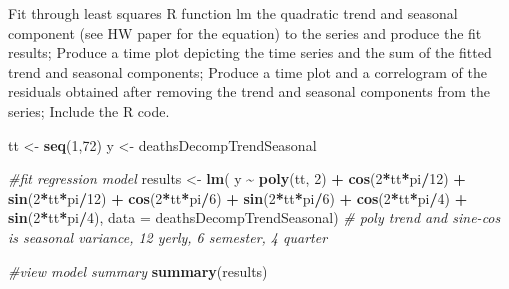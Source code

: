 \documentclass[
]{article}
\newenvironment{Shaded}{\begin{snugshade}}{\end{snugshade}}
\newcommand{\AttributeTok}[1]{\textcolor[rgb]{0.13,0.29,0.53}{#1}}
\newcommand{\CommentTok}[1]{\textcolor[rgb]{0.56,0.35,0.01}{\textit{#1}}}
\newcommand{\DecValTok}[1]{\textcolor[rgb]{0.00,0.00,0.81}{#1}}
\newcommand{\FunctionTok}[1]{\textcolor[rgb]{0.13,0.29,0.53}{\textbf{#1}}}
\newcommand{\NormalTok}[1]{#1}
\newcommand{\OtherTok}[1]{\textcolor[rgb]{0.56,0.35,0.01}{#1}}
\newcommand{\SpecialCharTok}[1]{\textcolor[rgb]{0.81,0.36,0.00}{\textbf{#1}}}
\begin{document}
Fit through least squares R function lm the quadratic trend and seasonal
component (see HW paper for the equation) to the series and produce the
fit results; Produce a time plot depicting the time series and the sum
of the fitted trend and seasonal components; Produce a time plot and a
correlogram of the residuals obtained after removing the trend and
seasonal components from the series; Include the R code.

\begin{Shaded}
\begin{Highlighting}[]
\NormalTok{tt }\OtherTok{\textless{}{-}} \FunctionTok{seq}\NormalTok{(}\DecValTok{1}\NormalTok{,}\DecValTok{72}\NormalTok{)}
\NormalTok{y }\OtherTok{\textless{}{-}}\NormalTok{ deathsDecompTrendSeasonal}

\CommentTok{\#fit regression model}
\NormalTok{results }\OtherTok{\textless{}{-}} \FunctionTok{lm}\NormalTok{( y }\SpecialCharTok{\textasciitilde{}} \FunctionTok{poly}\NormalTok{(tt, }\DecValTok{2}\NormalTok{) }\SpecialCharTok{+}
                 \FunctionTok{cos}\NormalTok{(}\DecValTok{2}\SpecialCharTok{*}\NormalTok{tt}\SpecialCharTok{*}\NormalTok{pi}\SpecialCharTok{/}\DecValTok{12}\NormalTok{) }\SpecialCharTok{+} \FunctionTok{sin}\NormalTok{(}\DecValTok{2}\SpecialCharTok{*}\NormalTok{tt}\SpecialCharTok{*}\NormalTok{pi}\SpecialCharTok{/}\DecValTok{12}\NormalTok{) }\SpecialCharTok{+}
                 \FunctionTok{cos}\NormalTok{(}\DecValTok{2}\SpecialCharTok{*}\NormalTok{tt}\SpecialCharTok{*}\NormalTok{pi}\SpecialCharTok{/}\DecValTok{6}\NormalTok{) }\SpecialCharTok{+} \FunctionTok{sin}\NormalTok{(}\DecValTok{2}\SpecialCharTok{*}\NormalTok{tt}\SpecialCharTok{*}\NormalTok{pi}\SpecialCharTok{/}\DecValTok{6}\NormalTok{) }\SpecialCharTok{+}
                 \FunctionTok{cos}\NormalTok{(}\DecValTok{2}\SpecialCharTok{*}\NormalTok{tt}\SpecialCharTok{*}\NormalTok{pi}\SpecialCharTok{/}\DecValTok{4}\NormalTok{) }\SpecialCharTok{+} \FunctionTok{sin}\NormalTok{(}\DecValTok{2}\SpecialCharTok{*}\NormalTok{tt}\SpecialCharTok{*}\NormalTok{pi}\SpecialCharTok{/}\DecValTok{4}\NormalTok{), }\AttributeTok{data =}\NormalTok{ deathsDecompTrendSeasonal)}
\CommentTok{\# poly trend and sine{-}cos is seasonal variance, 12 yerly, 6 semester, 4 quarter}

\CommentTok{\#view model summary}
\FunctionTok{summary}\NormalTok{(results)}
\end{Highlighting}
\end{Shaded}
\end{document}
